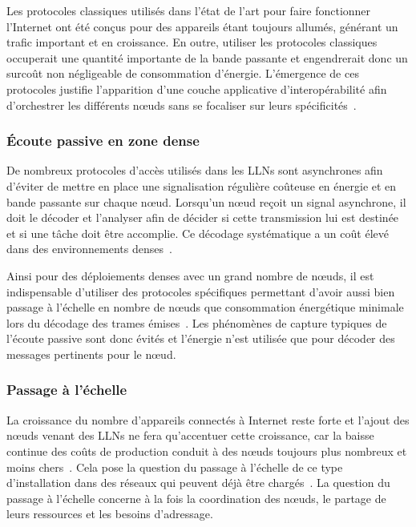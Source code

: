 Les protocoles classiques utilisés dans l'état de l'art pour faire fonctionner l'Internet ont été conçus pour des appareils étant toujours allumés, générant un trafic important et en croissance.
En outre, utiliser les protocoles classiques occuperait une quantité importante de la bande passante et engendrerait donc un surcoût non négligeable de consommation d'énergie.
L'émergence de ces protocoles justifie l'apparition d'une couche applicative d'interopérabilité afin d'orchestrer les différents nœuds sans se focaliser sur leurs spécificités~\cite{van2008achieving}.

\subsubsection{Écoute passive en zone dense}

De nombreux protocoles d'accès utilisés dans les \ac{LLN}s sont asynchrones afin d'éviter de mettre en place une signalisation régulière coûteuse en énergie et en bande passante sur chaque nœud.
Lorsqu'un nœud reçoit un signal asynchrone, il doit le décoder et l'analyser afin de décider si cette transmission lui est destinée et si une tâche doit être accomplie.
Ce décodage systématique a un coût élevé dans des environnements denses~\cite{langendoen2008medium}.


Ainsi pour des déploiements denses avec un grand nombre de nœuds, il est indispensable d'utiliser des protocoles spécifiques permettant d'avoir aussi bien passage à l'échelle en nombre de nœuds que consommation énergétique minimale lors du décodage des trames émises~\cite{6tisch}.
Les phénomènes de capture typiques de l'écoute passive sont donc évités et l'énergie n'est utilisée que pour décoder des messages pertinents pour le nœud.

\subsubsection{Passage à l'échelle}

La croissance du nombre d'appareils connectés à Internet reste forte et l'ajout des nœuds venant des \ac{LLN}s ne fera qu'accentuer cette croissance, car la baisse continue des coûts de production conduit à des nœuds toujours plus nombreux et moins chers~\cite{tan2010future, loomis2012forecasting}.
Cela pose la question du passage à l'échelle de ce type d'installation dans des réseaux qui peuvent déjà être chargés~\cite{murugesan2008harnessing,brownlee2002understanding,bandyopadhyay2011internet}.
La question du passage à l'échelle concerne à la fois la coordination des nœuds, le partage de leurs ressources et les besoins d'adressage.

